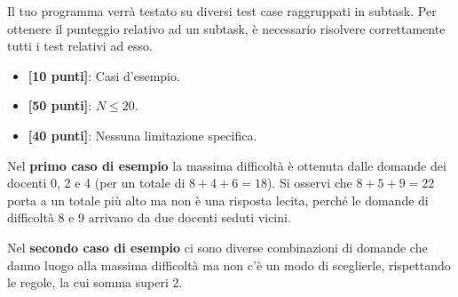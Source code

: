 \pagebreak

\Scoring
Il tuo programma verrà testato su diversi test case raggruppati in subtask.
Per ottenere il punteggio relativo ad un subtask, è necessario risolvere
correttamente tutti i test relativi ad esso.
\begin{itemize}[nolistsep,itemsep=2mm]
\item \textbf{ [10 punti]}: Casi d'esempio.
\item \textbf{ [50 punti]}: $N \le 20$.
\item \textbf{ [40 punti]}: Nessuna limitazione specifica.
\end{itemize}

\Examples
\begin{example}
%
%
\end{example}

\Explanation

Nel \textbf{primo caso di esempio} la massima difficoltà è ottenuta dalle domande dei docenti 0, 2 e 4 (per un totale di $8 + 4 + 6 = 18$). Si osservi che $8 + 5 + 9 = 22$ porta a un totale più alto ma non è una risposta lecita, perché le domande di difficoltà 8 e 9 arrivano da due docenti seduti vicini.

Nel \textbf{secondo caso di esempio} ci sono diverse combinazioni di domande che danno luogo alla massima difficoltà ma non c'è un modo di sceglierle, rispettando le regole, la cui somma superi 2.
